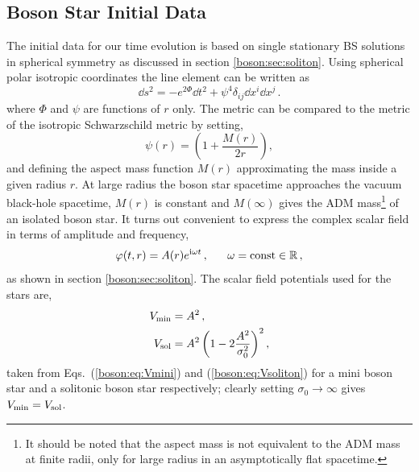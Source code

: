 \subsection{Boson Star Initial Data}
%
The initial data for our time evolution is based on single stationary
BS solutions in spherical symmetry as discussed in section \ref{boson:sec:soliton}.
Using spherical polar isotropic coordinates the
line element can be written as
%
\begin{equation}
  \dd s^2 =
  -e^{2\Phi} \dd t^2
  + \psi^4 \delta_{ij} \dd x^i \dd x^j\,.
  \label{mal:eq:ds2sym}
\end{equation}
%
where $\Phi$ and $\psi$ are functions of $r$ only. The metric can be compared to
the metric of the isotropic Schwarzschild metric by setting,
\begin{equation}
\psi(r) = \left(1+\frac{M(r)}{2 r} \right) \label{malaise:eq:aspect_mass_def},
\end{equation}
and defining the aspect mass function $M(r)$ approximating the mass inside a given
radius $r$. At large radius the boson star spacetime approaches the vacuum
black-hole spacetime, $M(r)$ is constant and $M(\infty)$ gives the
ADM mass\footnote{It should be noted that the aspect mass is not equivalent to
the ADM mass at finite radii, only for large radius in an asymptotically flat spacetime.}
of an isolated boson star.
It turns out convenient to express the complex
scalar field in terms of amplitude and frequency,
%
\begin{equation}
  \varphi(t,r) =
  A(r)
  e^{{\rm i} \omega t}\,,~~~~~\omega = \mathrm{const}\in \mathbb{R}\,,
\end{equation}
as shown in section \ref{boson:sec:soliton}. The scalar field potentials used for the stars are,
\begin{align}
  {V}_{\rm min} &= {A}^2\,,~~~~~~~~~~ \label{mal:eq:Vmini} \\
  {V}_{\rm sol} &= {A}^2 \left( 1-2\frac{{A}^2}{{\sigma}_0^2} \right)^2, \label{mal:eq:Vsoliton}
\end{align}
taken from Eqs.~(\ref{boson:eq:Vmini}) and (\ref{boson:eq:Vsoliton}) for a mini boson star and a solitonic boson star respectively; clearly setting $\sigma_0 \rightarrow \infty$ gives $V_{\rm min} = V_{\rm sol}$.



